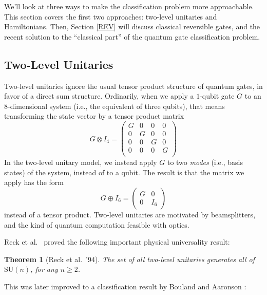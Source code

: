 \documentclass[12pt]{report}
\theoremstyle{plain}
\newtheorem{theorem}{Theorem}[section]
\theoremstyle{definition}
\begin{document}
We'll look at three ways to make the classification problem more approachable. This section covers the first two approaches: two-level unitaries and Hamiltonians.  Then, Section \ref{REV} will discuss classical reversible gates, and the recent solution to the ``classical part'' of the quantum gate classification problem.

\subsection{Two-Level Unitaries}

Two-level unitaries ignore the usual tensor product structure of quantum gates, in favor of a direct sum structure. Ordinarily, when we apply a $1$-qubit gate $G$ to an $8$-dimensional system (i.e., the equivalent of three qubits), that means transforming the state vector by a tensor product matrix
$$
G \otimes I_4 =
\begin{pmatrix}
G & 0 & 0 & 0 \\
0 & G & 0 & 0 \\
0 & 0 & G & 0 \\
0 & 0 & 0 & G \\
\end{pmatrix}
$$
In the two-level unitary model, we instead apply $G$ to two \emph{modes} (i.e., basis states) of the system, instead of to a qubit. The result is that the matrix we apply has the form
$$
G \oplus I_6 =
\begin{pmatrix}
G & 0 \\
0 & I_6
\end{pmatrix}
$$
instead of a tensor product. Two-level unitaries are motivated by beamsplitters, and the kind of quantum computation feasible with optics.

Reck et al.\ \cite{reck} proved the following important physical universality result:

\begin{theorem}[Reck et al.\ '94]
The set of all two-level unitaries generates all of $\mathrm{SU}(n)$, for any $n\ge 2$.
\end{theorem}

This was later improved to a classification result by Bouland and Aaronson \cite{boulandaaronson14}:
\end{document}

